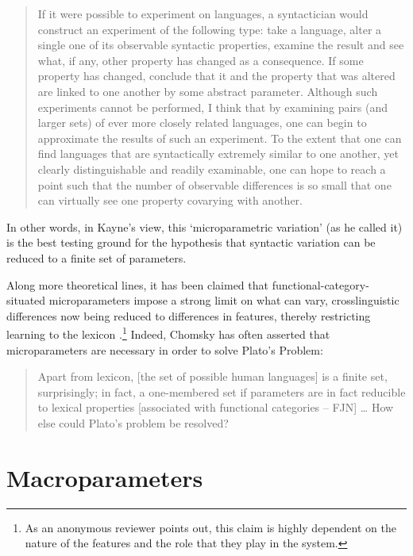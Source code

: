 \documentclass[output=paper,
modfonts
]{LSP/langsci}
\begin{document}
\begin{quote}
If it were possible to experiment on languages, a syntactician would
construct an experiment of the following type: take a language, alter a
single one of its observable syntactic properties, examine the result
and see what, if any, other property has changed as a consequence. If
some property has changed, conclude that it and the property that was
altered are linked to one another by some abstract parameter. Although
such experiments cannot be performed, I think that by examining pairs
(and larger sets) of ever more closely related languages, one can begin
to approximate the results of such an experiment. To the extent that one
can find languages that are syntactically extremely similar to one
another, yet clearly distinguishable and readily examinable, one can
hope to reach a point such that the number of observable differences is
so small that one can virtually see one property covarying with another. \citep[5--6]{kayne2000}
\end{quote}

In other words, in Kayne's view, this `microparametric variation' (as he
called it) is the best testing ground for the hypothesis that syntactic
variation can be reduced to a finite set of parameters.

Along more theoretical lines, it has been claimed that
functional-category-situated microparameters impose a strong limit on
what can vary, crosslinguistic differences now being reduced to
differences in features, thereby restricting learning to the lexicon
\citep{kayne2000,roberts2010,thornton2013}.\footnote{As an anonymous reviewer points out, this claim is
  highly dependent on the nature of the features and the role that they
  play in the system.} Indeed, Chomsky has often asserted that
microparameters are necessary in order to solve Plato's Problem:

\begin{quote}
Apart from lexicon, {[}the set of possible human languages{]} is a
finite set, surprisingly; in fact, a one-membered set if parameters are
in fact reducible to lexical properties {[}associated with functional
categories  --  FJN{]} \ldots{} How else could Plato's problem be
resolved? \citep[26]{chomsky1991}
\end{quote}

\section{Macroparameters}
\end{document}
